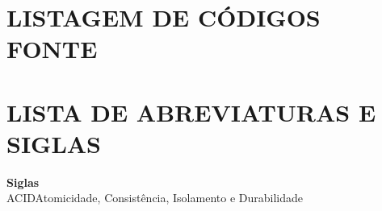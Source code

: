 \documentclass[
12pt,
a4paper,
semrecuonosumario,
sumario = abnt-6027-2012]{report}
\begin{document}
\newpage
\section*{\centering \small\bfseries LISTAGEM DE CÓDIGOS FONTE}

\newpage
\section*{\centering \small\bfseries LISTA DE ABREVIATURAS E SIGLAS}
\textbf{Siglas}\\

\noindent
ACID\hspace{1cm}Atomicidade, Consistência, Isolamento e Durabilidade
\clearpage

\renewcommand{\cftdotsep}{1}

\renewcommand{\contentsname}{\MakeUppercase{Sumário}}
\renewcommand{\cfttoctitlefont}{\bfseries\small} %
\renewcommand{\cftaftertoctitle}{\hfill\par}           %
\renewcommand{\cftchapfont}{\bfseries}
\renewcommand{\cftchappagefont}{\bfseries}

\renewcommand{\cftsecfont}{\bfseries}
\renewcommand{\cftsecpagefont}{\bfseries}

\renewcommand{\cftsubsecfont}{\bfseries}
\renewcommand{\cftsubsecpagefont}{\bfseries}

\setlength{\cftbeforetoctitleskip}{0pt}
\setlength{\cftaftertoctitleskip}{2ex}


\setcounter{tocdepth}{2}
\tableofcontents
\newpage

\titleformat{\chapter}{\bfseries\small}{\thechapter}{1em}{}
\titlespacing*{\chapter}{0pt}{2.5ex}{1.5ex}
\titleformat{\section}{\bfseries\small}{\thesection}{1em}{}
\titlespacing*{\section}{0pt}{2.0ex}{1.0ex}
\end{document}
